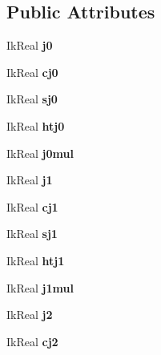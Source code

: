 \subsection*{Public Attributes}
\begin{DoxyCompactItemize}
\item 
Ik\-Real {\bfseries j0}\label{classikfast__kinematics__plugin_1_1_i_k_solver_a32e65ee50118982bb4de3bb9092a0f75}

\item 
Ik\-Real {\bfseries cj0}\label{classikfast__kinematics__plugin_1_1_i_k_solver_ad085b50315444c9757d30fa51a2d4eb8}

\item 
Ik\-Real {\bfseries sj0}\label{classikfast__kinematics__plugin_1_1_i_k_solver_a812607c49b7c7edeb1c358d84b1e4858}

\item 
Ik\-Real {\bfseries htj0}\label{classikfast__kinematics__plugin_1_1_i_k_solver_ab7b3b629a0a4417011e4adaeeb597186}

\item 
Ik\-Real {\bfseries j0mul}\label{classikfast__kinematics__plugin_1_1_i_k_solver_a31fd2b8a506769f89dde4e5ac9be2c47}

\item 
Ik\-Real {\bfseries j1}\label{classikfast__kinematics__plugin_1_1_i_k_solver_a54d9149923f4c894ed44a8d649973264}

\item 
Ik\-Real {\bfseries cj1}\label{classikfast__kinematics__plugin_1_1_i_k_solver_a130064712fbe6472935cf0360796575f}

\item 
Ik\-Real {\bfseries sj1}\label{classikfast__kinematics__plugin_1_1_i_k_solver_abdb51bfde20d27ef523c8e071ba8107c}

\item 
Ik\-Real {\bfseries htj1}\label{classikfast__kinematics__plugin_1_1_i_k_solver_a3b0b3dbb823d4be0a130600ed63b685d}

\item 
Ik\-Real {\bfseries j1mul}\label{classikfast__kinematics__plugin_1_1_i_k_solver_a65f7c6ae5396bf7fa3629e04dd6ff4dd}

\item 
Ik\-Real {\bfseries j2}\label{classikfast__kinematics__plugin_1_1_i_k_solver_a30ec42f1d98acc683b5b989ae196afeb}

\item 
Ik\-Real {\bfseries cj2}\label{classikfast__kinematics__plugin_1_1_i_k_solver_acb6ba4f1c860a56f1774bbc83697c9e9}


\end{DoxyCompactItemize}
